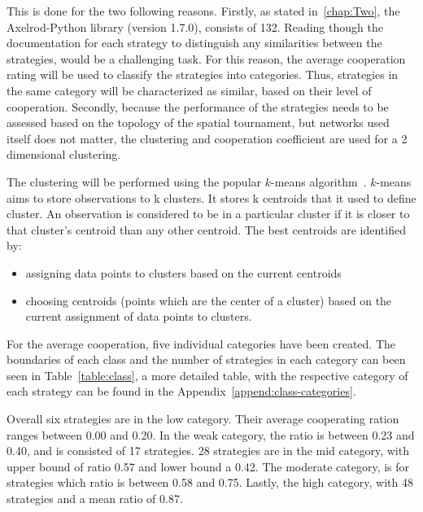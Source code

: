 This is done for the two following reasons. Firstly, as stated in~\autoref{chap:Two},
the Axelrod-Python library (version 1.7.0), consists of 132. Reading though
the documentation for each strategy to distinguish any similarities between
the strategies, would be a challenging task. For this reason, the average cooperation
rating will be used to classify the strategies into categories. Thus, strategies
in the same category will be characterized as similar, based on their level of
cooperation. Secondly, because the performance of the strategies needs to be assessed
based on the topology of the spatial tournament, but networks used itself does
not matter, the clustering and cooperation coefficient are used for a 2 dimensional
clustering.

The clustering will be performed using the popular \(k\)-means algorithm~\cite{kmeans}.
\(k\)-means aims to store observations to k clusters. It stores k centroids
that it used to define cluster. An observation is considered to be in a
particular cluster if it is closer to that cluster's centroid than any other
centroid. The best centroids are identified by:
\begin{itemize}
	\item assigning data points to clusters based on the current centroids
	\item choosing centroids (points which are the center of a cluster) based on
	      the current assignment of data points to clusters.
\end{itemize}

For the average cooperation, five individual categories have been created.
The boundaries of each class and the number of strategies in each category
can been seen in Table~\ref{table:class}, a more detailed table, with the respective category of each
strategy can be found in the Appendix~\ref{append:class-categories}.

Overall six strategies are in the low category. Their average cooperating ration
ranges between 0.00 and 0.20. In the weak category, the ratio is between
0.23 and 0.40, and is consisted of 17 strategies. 28 strategies are
in the mid category, with upper bound of ratio 0.57 and lower bound a 0.42.
The moderate category, is for strategies which ratio is between 0.58 and 0.75.
Lastly, the high category, with 48 strategies and a mean ratio of 0.87.

